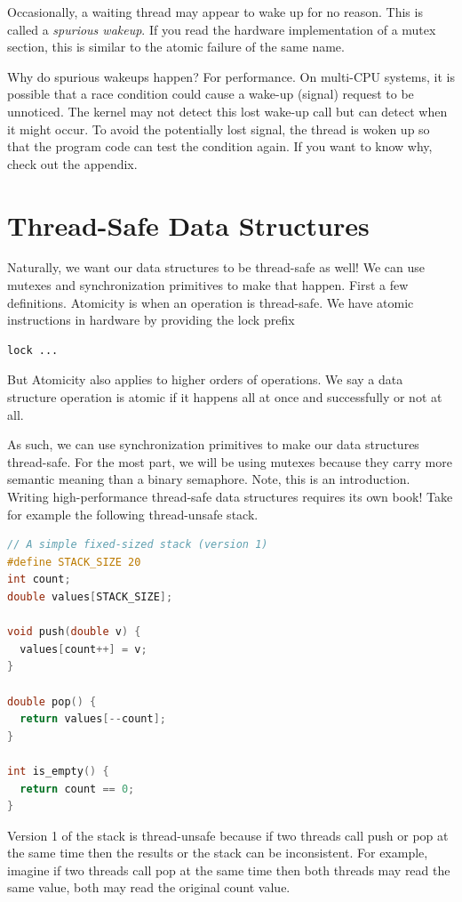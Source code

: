 Occasionally, a waiting thread may appear to wake up for no reason. This is called a \emph{spurious wakeup}.
If you read the hardware implementation of a mutex section, this is similar to the atomic failure of the same name.

Why do spurious wakeups happen?
For performance.
On multi-CPU systems, it is possible that a race condition could cause a wake-up (signal) request to be unnoticed.
The kernel may not detect this lost wake-up call but can detect when it might occur.
To avoid the potentially lost signal, the thread is woken up so that the program code can test the condition again.
If you want to know why, check out the appendix.

\section{Thread-Safe Data Structures}

Naturally, we want our data structures to be thread-safe as well!
We can use mutexes and synchronization primitives to make that happen.
First a few definitions.
Atomicity is when an operation is thread-safe.
We have atomic instructions in hardware by providing the lock prefix
\begin{lstlisting}
lock ...
\end{lstlisting}
But Atomicity also applies to higher orders of operations.
We say a data structure operation is atomic if it happens all at once and successfully or not at all.

As such, we can use synchronization primitives to make our data structures thread-safe.
For the most part, we will be using mutexes because they carry more semantic meaning than a binary semaphore.
Note, this is an introduction.
Writing high-performance thread-safe data structures requires its own book!
Take for example the following thread-unsafe stack.

\begin{lstlisting}[language=C]
// A simple fixed-sized stack (version 1)
#define STACK_SIZE 20
int count;
double values[STACK_SIZE];

void push(double v) {
  values[count++] = v;
}

double pop() {
  return values[--count];
}

int is_empty() {
  return count == 0;
}
\end{lstlisting}

Version 1 of the stack is thread-unsafe because if two threads call push or pop at the same time then the results or the stack can be inconsistent.
For example, imagine if two threads call pop at the same time then both threads may read the same value, both may read the original count value.

